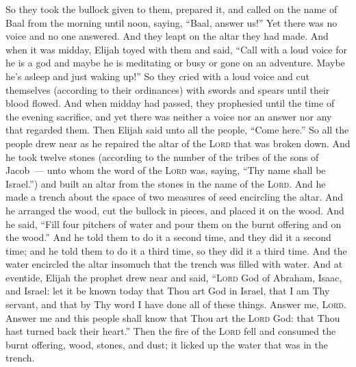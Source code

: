 \begin{inparaenum}
     So they took the bullock given to them, prepared it, and called on the name of Baal from the morning until noon, saying, ``Baal, answer us!'' Yet there was no voice and no one answered. And they leapt on the altar they had made.%
     And when it was midday, Elijah toyed with them and said, ``Call with a loud voice for he is a god and maybe he is meditating or busy or gone on an adventure. Maybe he's asleep and just waking up!''%
     So they cried with a loud voice and cut themselves (according to their ordinances) with swords and spears until their blood flowed.%
     And when midday had passed, they prophesied until the time of the evening sacrifice, and yet there was neither a voice nor an answer nor any that regarded them.%
     Then Elijah said unto all the people, ``Come here.'' So all the people drew near as he repaired the altar of the \textsc{Lord} that was broken down.%
     And he took twelve stones (according to the number of the tribes of the sons of Jacob~--- unto whom the word of the \textsc{Lord} was, saying, ``Thy name shall be Israel.'')%
     and built an altar from the stones in the name of the \textsc{Lord}. And he made a trench about the space of two measures of seed encircling the altar.%
     And he arranged the wood, cut the bullock in pieces, and placed it on the wood.%
      And he said, ``Fill four pitchers of water and pour them on the burnt offering and on the wood.'' And he told them to do it a second time, and they did it a second time; and he told them to do it a third time, so they did it a third time.%
      And the water encircled the altar insomuch that the trench was filled with water.%
     And at eventide, Elijah the prophet drew near and said, ``\textsc{Lord} God of Abraham, Isaac, and Israel: let it be known today that Thou art God in Israel, that I am Thy servant, and that by Thy word I have done all of these things.%
     Answer me, \textsc{Lord}. Answer me and this people shall know that Thou art the \textsc{Lord} God: that Thou hast turned back their heart.''%
     Then the fire of the \textsc{Lord} fell and consumed the burnt offering, wood, stones, and dust; it licked up the water that was in the trench.%

\end{inparaenum}
